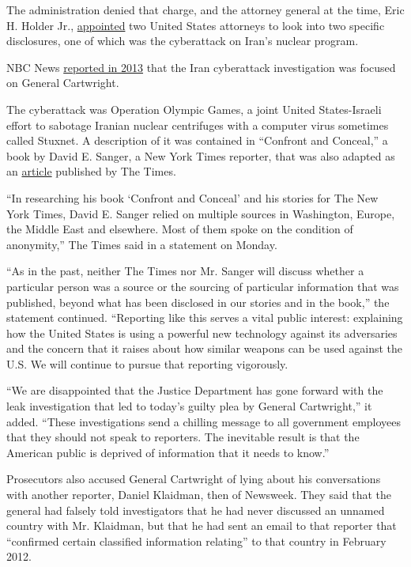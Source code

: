 The administration denied that charge, and the attorney general at the
time, Eric H. Holder Jr.,
\href{http://www.nytimes.com/2012/06/09/us/politics/holder-directs-us-attorneys-to-investigate-leaks.html}{appointed}
two United States attorneys to look into two specific disclosures, one
of which was the cyberattack on Iran's nuclear program.

NBC News
\href{http://investigations.nbcnews.com/_news/2013/06/27/19174350-ex-pentagon-general-target-of-leak-investigation-sources-say}{reported
in 2013} that the Iran cyberattack investigation was focused on General
Cartwright.

The cyberattack was Operation Olympic Games, a joint United
States-Israeli effort to sabotage Iranian nuclear centrifuges with a
computer virus sometimes called Stuxnet. A description of it was
contained in ``Confront and Conceal,'' a book by David E. Sanger, a New
York Times reporter, that was also adapted as an
\href{http://www.nytimes.com/2012/06/01/world/middleeast/obama-ordered-wave-of-cyberattacks-against-iran.html}{article}
published by The Times.

``In researching his book `Confront and Conceal' and his stories for The
New York Times, David E. Sanger relied on multiple sources in
Washington, Europe, the Middle East and elsewhere. Most of them spoke on
the condition of anonymity,'' The Times said in a statement on Monday.

``As in the past, neither The Times nor Mr. Sanger will discuss whether
a particular person was a source or the sourcing of particular
information that was published, beyond what has been disclosed in our
stories and in the book,'' the statement continued. ``Reporting like
this serves a vital public interest: explaining how the United States is
using a powerful new technology against its adversaries and the concern
that it raises about how similar weapons can be used against the U.S. We
will continue to pursue that reporting vigorously.

``We are disappointed that the Justice Department has gone forward with
the leak investigation that led to today's guilty plea by General
Cartwright,'' it added. ``These investigations send a chilling message
to all government employees that they should not speak to reporters. The
inevitable result is that the American public is deprived of information
that it needs to know.''

Prosecutors also accused General Cartwright of lying about his
conversations with another reporter, Daniel Klaidman, then of Newsweek.
They said that the general had falsely told investigators that he had
never discussed an unnamed country with Mr. Klaidman, but that he had
sent an email to that reporter that ``confirmed certain classified
information relating'' to that country in February 2012.

